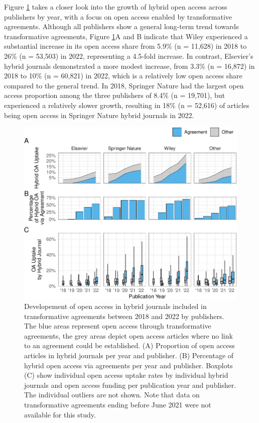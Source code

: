 \documentclass[a4paper,man,floatsintext,longtable,noextraspace,12pt]{apa6}
\begin{document}
Figure \ref{fig:publisher_figure} takes a closer look into the growth of
hybrid open access across publishers by year, with a focus on open
access enabled by transformative agreements. Although all publishers
show a general long-term trend towards transformative agreements, Figure
\ref{fig:publisher_figure}A and B indicate that Wiley experienced a
substantial increase in its open access share from 5.9\% (n = 11,628) in
2018 to 26\% (n = 53,503) in 2022, representing a 4.5-fold increase. In
contrast, Elsevier's hybrid journals demonstrated a more modest
increase, from 3.3\% (n = 16,872) in 2018 to 10\% (n = 60,821) in 2022,
which is a relatively low open access share compared to the general
trend. In 2018, Springer Nature had the largest open access proportion
among the three publishers of 8.4\% (n = 19,701), but experienced a
relatively slower growth, resulting in 18\% (n = 52,616) of articles
being open access in Springer Nature hybrid journals in 2022.

\begin{figure}[ht!]

{\centering \includegraphics[width=0.99\linewidth,]{fig/publisher_figure-1} 

}

\caption{Developement of open access in hybrid journals included in transformative agreements between 2018 and 2022 by publishers. The blue areas represent open access through transformative agreements, the grey areas depict open access articles where no link to an agreement could be established. (A) Proportion of open access articles in hybrid journals per year and publisher. (B) Percentage of hybrid open access via agreements per year and publisher. Boxplots (C) show individual open access uptake rates by individual hybrid journals and open access funding per publication year and publisher. The individual outliers are not shown. Note that data on transformative agreements ending before June 2021 were not available for this study.}\label{fig:publisher_figure}
\end{figure}
\end{document}

